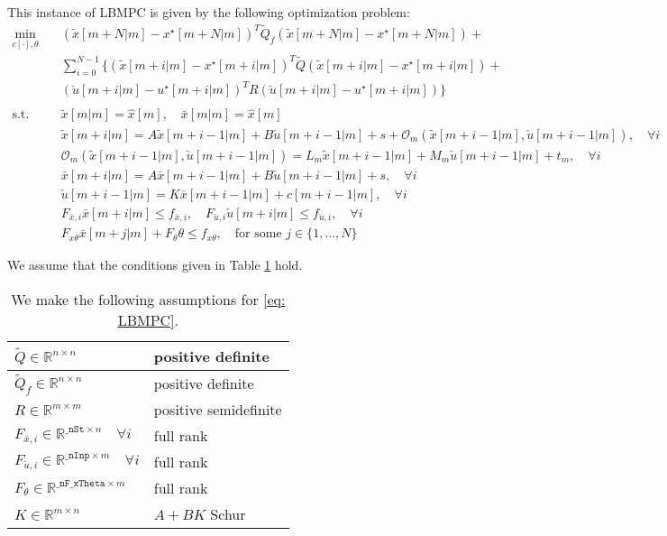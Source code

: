 \documentclass[letter]{article}
\begin{document}
\begin{sffamily}
\noindent
This instance of LBMPC is given by the following optimization problem:
\begin{align}\label{eq: LBMPC}
	\min_{c[\cdot],\theta} \quad & (\tilde{x}[m+N|m]-x^\star[m+N|m])^T \tilde{Q}_f (\tilde{x}[m+N|m]-x^\star[m+N|m]) + \\
	&  \sum_{i=0} ^ {N-1} \{ (\tilde{x}[m+i|m]-x^\star[m+i|m])^T \tilde{Q} (\tilde{x}[m+i|m]-x^\star[m+i|m]) + \nonumber \\
	& (\check{u}[m+i|m]-u^\star[m+i|m])^T R (\check{u}[m+i|m]-u^\star[m+i|m]) \}  \nonumber \\	
		\nonumber \\		
	\text{s.t.} \quad & \tilde{x}[m|m] = \hat{x}[m],\quad \bar{x}[m|m] = \hat{x}[m] \nonumber \\
		&  \tilde{x}[m+i|m]= A \tilde{x}[m+i-1|m] + B \check{u}[m+i-1|m] + s + \mathcal{O}_m(\tilde{x}[m+i-1|m],\check{u}[m+i-1|m]), \quad \forall i \nonumber\\
		& \mathcal{O}_m(\tilde{x}[m+i-1|m],\check{u}[m+i-1|m]) = L_m \tilde{x}[m+i-1|m] + M_m \check{u}[m+i-1|m] + t_m, \quad \forall i \nonumber \\
	 &	\bar{x}[m+i|m]= A \bar{x}[m+i-1|m] + B \check{u}[m+i-1|m]+s, \quad \forall i \nonumber\\
	 & \check{u}[m+i-1|m] = K\bar{x}[m+i-1|m] + c[m+i-1|m], \quad \forall i \nonumber \\
	 & F_{\bar{x},i}\bar{x}[m+i|m] \leq f_{\bar{x},i}, \quad F_{\check{u},i}\check{u}[m+i|m] \leq f_{\check{u},i}, \quad \forall i \nonumber \\
	 & F_{x\theta}\bar{x}[m+j|m] + F_\theta \theta \leq f_{x\theta},\quad \text{for some } j\in\{1,\ldots, N\} \nonumber
\end{align}

\noindent
We assume that the conditions given in Table \ref{tab: matrix assumptions} hold. \\

\begin{table}[!htdp]
\caption{We make the following assumptions for \eqref{eq: LBMPC}.}
\begin{center}
\begin{tabular}{|l|l|}\hline
 $\tilde{Q}\in\mathbb{R}^{n\times n}$ & positive definite\\ \hline
 $\tilde{Q}_f\in\mathbb{R}^{n\times n}$ & positive definite\\ \hline
 $R\in\mathbb{R}^{m\times m}$ & positive semidefinite \\ \hline
 $F_{\bar{x},i}\in\mathbb{R}^{\texttt{\_nSt}\times n}\quad \forall i$ & full rank \\ \hline
 $F_{\check{u},i}\in\mathbb{R}^{\texttt{\_nInp}\times m}\quad \forall i$ & full rank \\ \hline
 $F_\theta\in\mathbb{R}^{\texttt{\_nF\_xTheta}\times m}$ & full rank \\ \hline
 $K\in\mathbb{R}^{m\times n}$ & $A+BK$ Schur \\ \hline
\end{tabular}
\end{center}
\label{tab: matrix assumptions}
\end{table}



\end{sffamily}
\end{document}
